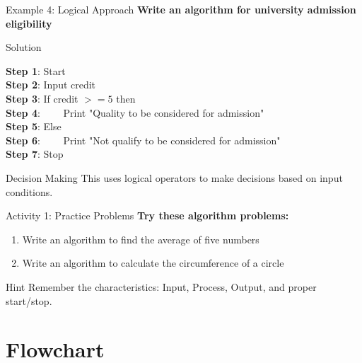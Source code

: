 \documentclass[aspectratio=169]{beamer}
\begin{document}
\begin{frame}{Example 4: Logical Approach}
    \textbf{Write an algorithm for university admission eligibility}
    
    \begin{exampleblock}{Solution}
         
             \textbf{Step 1}: Start \\
            \textbf{Step 2}: Input credit  \\
             \textbf{Step 3}: If credit $>= 5$ then \\
             \textbf{Step 4}: \ \  \ \ Print "Quality to be considered for admission"  \\
            \textbf{Step 5}: Else  \\
             \textbf{Step 6}: \ \  \ \ Print "Not qualify to be considered for admission"  \\
             \textbf{Step 7}: Stop
       
    \end{exampleblock}
    
    \vspace{0.3cm}
    \begin{alertblock}{Decision Making}
        This uses logical operators to make decisions based on input conditions.
    \end{alertblock}
\end{frame}

\begin{frame}{Activity 1: Practice Problems}
    \textbf{Try these algorithm problems:}
    
    \begin{enumerate}
        \item Write an algorithm to find the average of five numbers
        \item Write an algorithm to calculate the circumference of a circle
    \end{enumerate}
    
    \vspace{0.5cm}
    \begin{block}{Hint}
        Remember the characteristics: Input, Process, Output, and proper start/stop.
    \end{block}
\end{frame}

\section{Flowchart}
\end{document}
